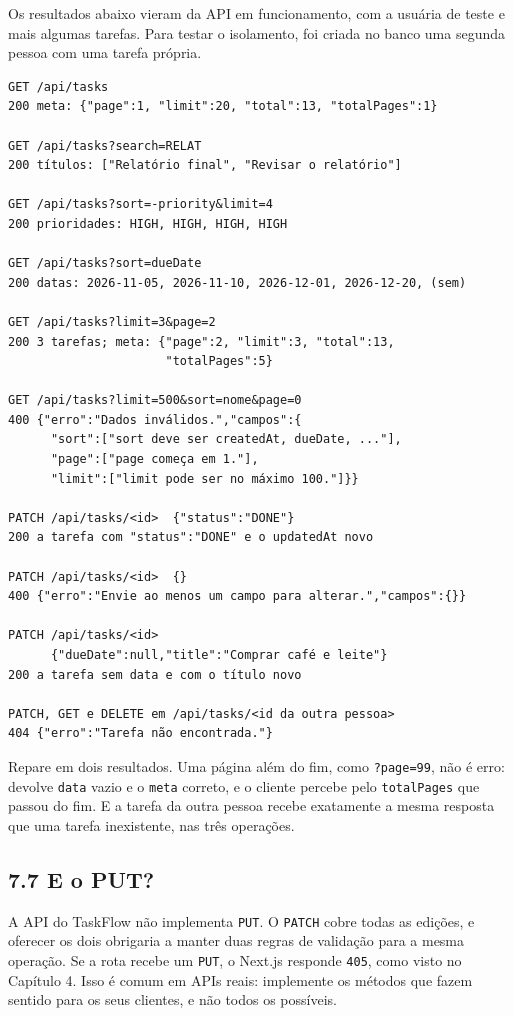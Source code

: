 Os resultados abaixo vieram da API em funcionamento, com a usuária de teste e mais algumas tarefas. Para testar o isolamento, foi criada no banco uma segunda pessoa com uma tarefa própria.

\begin{codigo}
\begin{Verbatim}[breaklines=true, breaksymbolleft={}, fontsize=\footnotesize]
GET /api/tasks
200 meta: {"page":1, "limit":20, "total":13, "totalPages":1}

GET /api/tasks?search=RELAT
200 títulos: ["Relatório final", "Revisar o relatório"]

GET /api/tasks?sort=-priority&limit=4
200 prioridades: HIGH, HIGH, HIGH, HIGH

GET /api/tasks?sort=dueDate
200 datas: 2026-11-05, 2026-11-10, 2026-12-01, 2026-12-20, (sem)

GET /api/tasks?limit=3&page=2
200 3 tarefas; meta: {"page":2, "limit":3, "total":13,
                      "totalPages":5}

GET /api/tasks?limit=500&sort=nome&page=0
400 {"erro":"Dados inválidos.","campos":{
      "sort":["sort deve ser createdAt, dueDate, ..."],
      "page":["page começa em 1."],
      "limit":["limit pode ser no máximo 100."]}}

PATCH /api/tasks/<id>  {"status":"DONE"}
200 a tarefa com "status":"DONE" e o updatedAt novo

PATCH /api/tasks/<id>  {}
400 {"erro":"Envie ao menos um campo para alterar.","campos":{}}

PATCH /api/tasks/<id>
      {"dueDate":null,"title":"Comprar café e leite"}
200 a tarefa sem data e com o título novo

PATCH, GET e DELETE em /api/tasks/<id da outra pessoa>
404 {"erro":"Tarefa não encontrada."}
\end{Verbatim}
\end{codigo}

Repare em dois resultados. Uma página além do fim, como \texttt{?page=99}, não é erro: devolve \texttt{data} vazio e o \texttt{meta} correto, e o cliente percebe pelo \texttt{totalPages} que passou do fim. E a tarefa da outra pessoa recebe exatamente a mesma resposta que uma tarefa inexistente, nas três operações.

\subsection{7.7 E o PUT?}

A API do TaskFlow não implementa \texttt{PUT}. O \texttt{PATCH} cobre todas as edições, e oferecer os dois obrigaria a manter duas regras de validação para a mesma operação. Se a rota recebe um \texttt{PUT}, o Next.js responde \texttt{405}, como visto no Capítulo 4. Isso é comum em APIs reais: implemente os métodos que fazem sentido para os seus clientes, e não todos os possíveis.

